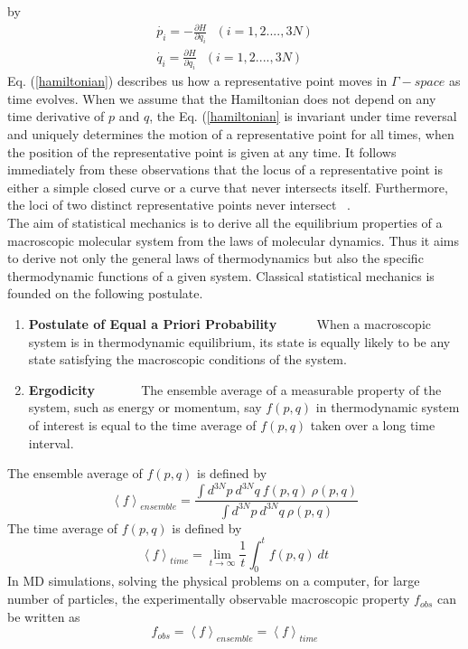 \begin{sloppypar}
by
\begin{eqnarray}\label{hamiltonian}
\dot{p_i} = -\frac{\partial {H}} {\partial q_i}~~~ (i = 1, 2  ...., 3N)\nonumber\\
\dot{q_i} = \frac{\partial {H}} {\partial q_i}~~~ (i = 1, 2  ...., 3N) 
\end{eqnarray}
Eq. (\ref{hamiltonian}) describes us   how a representative point moves in $\Gamma-space$ as time evolves. When we assume that the Hamiltonian does not depend on any time derivative of $p$ and $q$, the Eq. (\ref{hamiltonian} is invariant under time reversal and uniquely determines the motion of a representative point for all times, when the position of the representative point is given at any time. It follows immediately from these observations that the locus of a representative point is either a simple
closed curve or a curve that never intersects itself. Furthermore, the loci of two distinct representative points never intersect ~\citep{huang2009}.\\
The aim of statistical mechanics is to derive all the equilibrium properties of
a macroscopic molecular system from the laws of molecular dynamics. Thus it
aims to derive not only the general laws of thermodynamics but also the specific
thermodynamic functions of a given system. Classical statistical mechanics is founded on the following postulate.
\begin{enumerate}
\item \textbf{Postulate of Equal a Priori Probability} ~~~~~  When a macroscopic system is in
thermodynamic equilibrium,  its state is  equally likely to be any state satisfying the macroscopic conditions of the system.
\item \textbf{Ergodicity } ~~~~~~ The ensemble average  of a measurable property of the system, such as energy or momentum, say $f(p,q)$ in thermodynamic system of interest is equal to the time average  of $f(p,q)$ taken over a long time interval.
\end{enumerate}
The ensemble average of $f(p, q)$ is defined by
\begin{equation}
\left\langle f \right\rangle_{ensemble} = \frac{\int d^{3N}p~ d^{3N}q~ f(p, q)~ \rho (p,q)} {\int d^{3N}p~ d^{3N}q~ \rho (p,q)}
\end{equation}
The time average of  $f(p, q)$ is defined by 
\begin{equation}
\left\langle f \right\rangle_{time} = \lim_{t\to\infty} \frac{1}{t} \int_{0}^{t} f(p, q) ~ dt
\end{equation}
In MD simulations, solving the physical problems on a computer, for large number of particles, the experimentally observable macroscopic property $f_{obs}$ can be written as \citep{huang2009, Allen1989}
\begin{equation}
 f _{obs} = \left\langle f \right\rangle_{ensemble} = \left\langle f \right\rangle_{time}
\end{equation}
\end{sloppypar}
